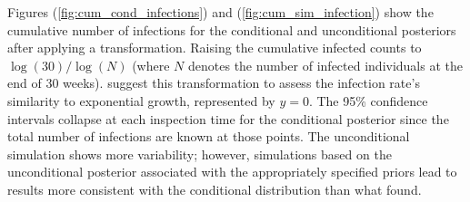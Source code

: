 \documentclass{uwstat572}
\begin{document}
Figures (\ref{fig:cum_cond_infections}) and (\ref{fig:cum_sim_infection}) show the cumulative number of infections for the conditional and unconditional posteriors after applying a transformation. 
Raising the cumulative infected counts to $\log(30)/\log(N)$ (where $N$ denotes the number of infected individuals at the end of 30 weeks). 
\citet{Brown} suggest this transformation to assess the infection rate's similarity to exponential growth, represented by $y=0$. 
The 95\% confidence intervals collapse at each inspection time for the conditional posterior since the total number of infections are known at those points. 
The unconditional simulation shows more variability; however, simulations based on the unconditional posterior associated with the appropriately specified priors lead to results more consistent with the conditional distribution than what \citet{Brown} found. 
\end{document}
